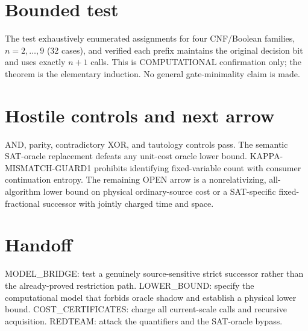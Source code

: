 \documentclass{article}
\begin{document}
\section*{Bounded test}
The test exhaustively enumerated assignments for four CNF/Boolean families, $n=2,\ldots,9$ (32 cases), and verified each prefix maintains the original decision bit and uses exactly $n+1$ calls. This is COMPUTATIONAL confirmation only; the theorem is the elementary induction. No general gate-minimality claim is made.
\section*{Hostile controls and next arrow}
AND, parity, contradictory XOR, and tautology controls pass. The semantic SAT-oracle replacement defeats any unit-cost oracle lower bound. KAPPA-MISMATCH-GUARD1 prohibits identifying fixed-variable count with consumer continuation entropy. The remaining OPEN arrow is a nonrelativizing, all-algorithm lower bound on physical ordinary-source cost or a SAT-specific fixed-fractional successor with jointly charged time and space.
\section*{Handoff}
MODEL\_BRIDGE: test a genuinely source-sensitive strict successor rather than the already-proved restriction path. LOWER\_BOUND: specify the computational model that forbids oracle shadow and establish a physical lower bound. COST\_CERTIFICATES: charge all current-scale calls and recursive acquisition. REDTEAM: attack the quantifiers and the SAT-oracle bypass.
\end{document}
